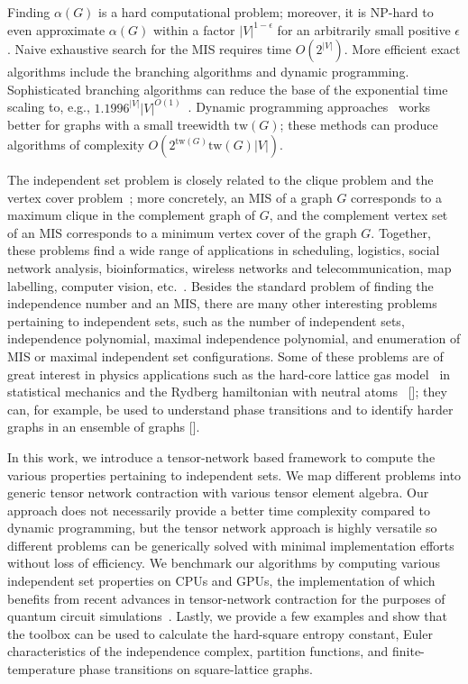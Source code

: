 \documentclass[onefignum, onetabnum]{siamart190516}
\newcommand{\<}{\langle}
\renewcommand{\>}{\rangle}
\newcommand{\red}[1]{[{\bf  \color{red}{ST: #1}}]}
\newcounter{example}
\begin{document}
Finding $\alpha(G)$ is a hard computational problem; moreover, it is NP-hard to even approximate $\alpha(G)$ within a factor $|V|^{1-\epsilon}$ for an arbitrarily small positive $\epsilon$.
Naive exhaustive search for the MIS requires time $O\left(2^{|V|} \right)$. More efficient exact algorithms include the branching algorithms and dynamic programming.
Sophisticated branching algorithms can reduce the base of the exponential time scaling to, e.g., $1.1996^{|V|} {|V|}^{O(1)}$~\cite{Xiao2017}.
Dynamic programming approaches~\cite{Courcelle1990, Fomin2013} works better for graphs with a small treewidth $\text{tw}(G)$;
these methods can produce algorithms of complexity $O(2^{\text{tw}(G)} \text{tw}(G) |V|)$.

The independent set problem is closely related to the clique problem and the vertex cover problem~\cite{Moore2011};
more concretely, an MIS of a graph $G$ corresponds to a maximum clique in the complement graph of $G$,
and the complement vertex set of an MIS corresponds to a minimum vertex cover of the graph $G$.
Together, these problems find a wide range of applications in scheduling, logistics, social network analysis, bioinformatics, wireless networks and telecommunication,
map labelling, computer vision, etc.~\cite{Butenko2003, Wu2015}.
Besides the standard problem of finding the independence number and an MIS, there are many other interesting problems pertaining to independent sets, such as the number of independent sets,
independence polynomial, maximal independence polynomial, and enumeration of MIS or maximal independent set configurations.
Some of these problems are of great interest in physics applications such as the hard-core lattice gas model~\cite{Dyre2016, Fernandes2007}
in statistical mechanics and the Rydberg hamiltonian with neutral atoms~\cite{Pichler2018} \red{cite experiment when it's ready};
they can, for example, be used to understand phase transitions and to identify harder graphs in an ensemble of graphs \red{cite experiment}.

In this work, we introduce a tensor-network based framework to compute the various properties pertaining to independent sets.
We map different problems into generic tensor network contraction with various tensor element algebra.
Our approach does not necessarily provide a better time complexity compared to dynamic programming,
but the tensor network approach is highly versatile so different problems can be generically solved with minimal implementation efforts without loss of efficiency.
We benchmark our algorithms by computing various independent set properties on CPUs and GPUs, the implementation of which benefits from recent advances in tensor-network contraction for the purposes of quantum circuit simulations~\cite{Gray2021, Pan2021}.
Lastly, we provide a few examples and show that the toolbox can be used to calculate the hard-square entropy constant,
Euler characteristics of the independence complex, partition functions, and finite-temperature phase transitions on square-lattice graphs. 
\end{document}
